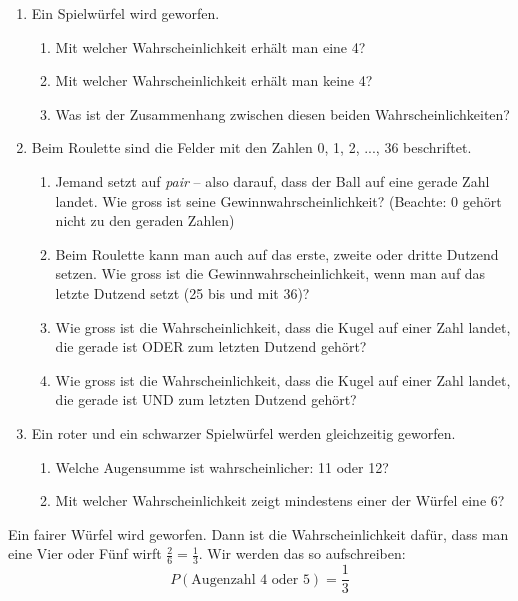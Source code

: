 \begin{LA}
{}{}
    \begin{enumerate}
        \item Ein Spielwürfel wird geworfen. 
        \begin{enumerate}
            \item Mit welcher Wahrscheinlichkeit erhält man eine 4?
            \item Mit welcher Wahrscheinlichkeit erhält man keine 4? 
            \item Was ist der Zusammenhang zwischen diesen beiden Wahrscheinlichkeiten?
        \end{enumerate}
        \item Beim Roulette sind die Felder mit den Zahlen 0, 1, 2, ..., 36 beschriftet.
        \begin{enumerate}
            \item Jemand setzt auf \textit{pair} – also darauf, dass der Ball auf eine gerade Zahl landet. Wie gross ist seine Gewinnwahrscheinlichkeit? (Beachte: 0 gehört nicht zu den geraden Zahlen)
            \item  Beim Roulette kann man auch auf das erste, zweite oder dritte Dutzend setzen. Wie gross ist die Gewinnwahrscheinlichkeit, wenn man auf das letzte Dutzend setzt (25 bis und mit 36)?
            \item Wie gross ist die Wahrscheinlichkeit, dass die Kugel auf einer Zahl landet, die gerade ist ODER zum letzten Dutzend gehört?
            \item Wie gross ist die Wahrscheinlichkeit, dass die Kugel auf einer Zahl landet, die gerade ist UND zum letzten Dutzend gehört?
        \end{enumerate}
        \item Ein roter und ein schwarzer Spielwürfel werden gleichzeitig geworfen. 
        \begin{enumerate}
            \item Welche Augensumme ist wahrscheinlicher: 11 oder 12?
            \item  Mit welcher Wahrscheinlichkeit zeigt mindestens einer der Würfel eine 6?
        
        \end{enumerate}
        
      
    \end{enumerate}
\end{LA}
\clearpage
Ein fairer Würfel wird geworfen. Dann ist die Wahrscheinlichkeit dafür, dass man eine Vier oder Fünf wirft $\frac{2}{6} = \frac{1}{3}$. Wir werden das so aufschreiben:
$$P(\text{Augenzahl 4 oder 5}) = \frac{1}{3}$$

